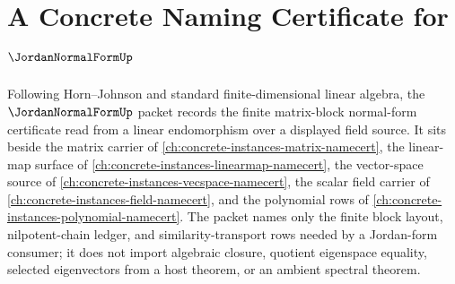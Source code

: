 \chapter{A Concrete Naming Certificate for $\JordanNormalFormUp$}
\label{ch:concrete-instances-jordan-normal-form-namecert}

Following Horn--Johnson and standard finite-dimensional linear algebra, the $\JordanNormalFormUp$ packet records the finite matrix-block normal-form certificate read from a linear endomorphism over a displayed field source. It sits beside the matrix carrier of \autoref{ch:concrete-instances-matrix-namecert}, the linear-map surface of \autoref{ch:concrete-instances-linearmap-namecert}, the vector-space source of \autoref{ch:concrete-instances-vecspace-namecert}, the scalar field carrier of \autoref{ch:concrete-instances-field-namecert}, and the polynomial rows of \autoref{ch:concrete-instances-polynomial-namecert}. The packet names only the finite block layout, nilpotent-chain ledger, and similarity-transport rows needed by a Jordan-form consumer; it does not import algebraic closure, quotient eigenspace equality, selected eigenvectors from a host theorem, or an ambient spectral theorem.

